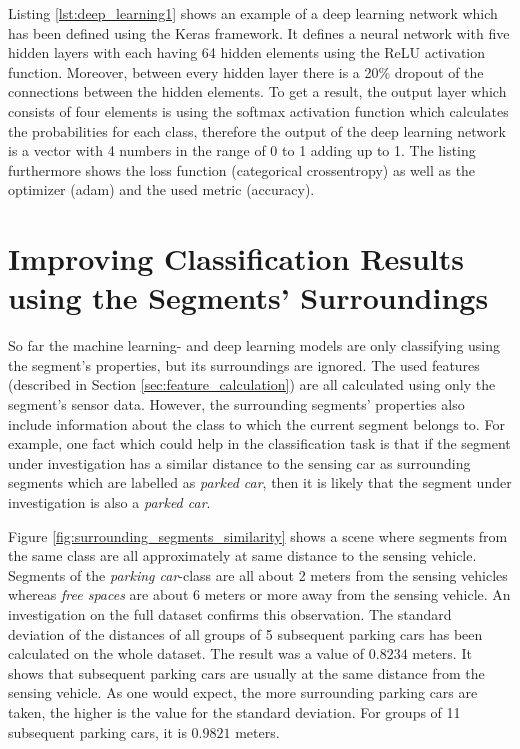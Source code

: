 Listing \ref{lst:deep_learning1} shows an example of a deep learning network which has been defined using the Keras framework. It defines a neural network with five hidden layers with each having 64 hidden elements using the ReLU activation function. Moreover, between every hidden layer there is a 20\% dropout of the connections between the hidden elements. To get a result, the output layer which consists of four elements is using the softmax activation function which calculates the probabilities for each class, therefore the output of the deep learning network is a vector with 4 numbers in the range of 0 to 1 adding up to 1. The listing furthermore shows the loss function (categorical crossentropy) as well as the optimizer (adam) and the used metric (accuracy).











\section{Improving Classification Results using the Segments' Surroundings}
\label{sec:improv_classification_surrounding_segments}

So far the machine learning- and deep learning models are only classifying using the segment's properties, but its surroundings are ignored. The used features (described in Section \ref{sec:feature_calculation}) are all calculated using only the segment's sensor data. However, the surrounding segments' properties also include information about the class to which the current segment belongs to. 
For example, one fact which could help in the classification task is that if the segment under investigation has a similar distance to the sensing car as surrounding segments which are labelled as \emph{parked car}, then it is likely that the segment under investigation is also a \emph{parked car}. 

Figure \ref{fig:surrounding_segments_similarity} shows a scene where segments from the same class are all approximately at same distance to the sensing vehicle. Segments of the \emph{parking car}-class are all about 2 meters from the sensing vehicles whereas \emph{free spaces} are about 6 meters or more away from the sensing vehicle. An investigation on the full dataset confirms this observation. The standard deviation of the distances of all groups of 5 subsequent parking cars has been calculated on the whole dataset. The result was a value of $0.8234$ meters. It shows that subsequent parking cars are usually at the same distance from the sensing vehicle. As one would expect, the more surrounding parking cars are taken, the higher is the value for the standard deviation. For groups of 11 subsequent parking cars, it is $0.9821$ meters.

